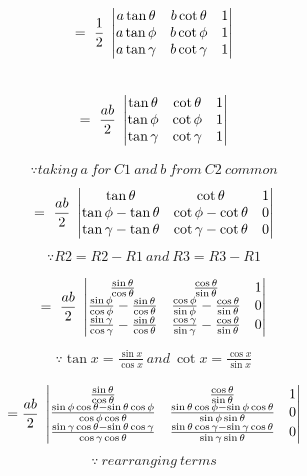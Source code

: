 \documentclass[journal,12pt,twocolumn]{IEEEtran}
\begin{document}
\begin{multline}
=~\frac{1}{2}~\begin{vmatrix}
 a\tan\theta & b\cot\theta & 1  \\ 
 a\tan\phi & b\cot\phi & 1  \\
 a\tan\gamma & b\cot\gamma & 1 
\end{vmatrix}\end{multline}\\
\begin{multline}
=~\frac{ab}{2}~\begin{vmatrix}
 \tan\theta & \cot\theta & 1  \\ 
 \tan\phi &   \cot\phi & 1  \\
 \tan\gamma & \cot\gamma & 1 
\end{vmatrix}
\end{multline}

\begin{align*}
\because taking ~a~ for ~C1 ~and~ b ~from~ C2~ common 
\end{align*}
\begin{multline}
=~\frac{ab}{2}~\begin{vmatrix}
 \tan\theta & \cot\theta & 1  \\ 
 \tan\phi-\tan\theta & \cot\phi-\cot\theta & 0  \\
 \tan\gamma-\tan\theta & \cot\gamma-\cot\theta & 0 
\end{vmatrix}\end{multline}
\begin{align*}
\because R2=R2-R1 ~and~ R3=R3-R1
\end{align*}

\begin{multline}
=~\frac{ab}{2}~\begin{vmatrix}
 \frac{\sin\theta}{\cos\theta} & \frac{\cos\theta}{\sin\theta} & 1  \\ 
 \frac{\sin\phi}{\cos\phi}-\frac{\sin\theta}{\cos\theta} & \frac{\cos\phi}{\sin\phi}-\frac{\cos\theta}{\sin\theta} & 0  \\
 \frac{\sin\gamma}{\cos\gamma}-\frac{\sin\theta}{\cos\theta} & \frac{\cos\gamma}{\sin\gamma}-\frac{\cos\theta}{\sin\theta} & 0 
\end{vmatrix}\end{multline}
\begin{align*}
\because \tan x = \frac{\sin x}{\cos x}~and~\cot x = \frac{\cos x}{\sin x} \end{align*}

\begin{multline}
=\frac{ab}{2}~\begin{vmatrix}
 \frac{\sin\theta}{\cos\theta} & \frac{\cos\theta}{\sin\theta} & 1  \\ 
 \frac{\sin\phi\cos\theta - \sin\theta\cos\phi}{\cos\phi\cos\theta} & \frac{\sin\theta\cos\phi - \sin\phi\cos\theta}{\sin\phi\sin\theta} & 0  \\
  \frac{\sin\gamma\cos\theta - \sin\theta\cos\gamma}{\cos\gamma\cos\theta} & \frac{\sin\theta\cos\gamma - \sin\gamma\cos\theta}{\sin\gamma\sin\theta} & 0
\end{vmatrix}   
\end{multline}
\begin{align*}
\because ~rearranging ~terms 
\end{align*}
\end{document}
